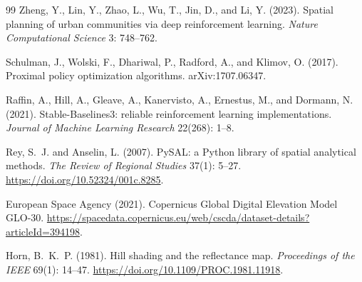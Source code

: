 \documentclass[]{interact}
\theoremstyle{plain}
\begin{document}
\begin{thebibliography}{99}
Zheng, Y., Lin, Y., Zhao, L., Wu, T., Jin, D., and Li, Y. (2023).
Spatial planning of urban communities via deep reinforcement learning.
\textit{Nature Computational Science} 3: 748--762.

Schulman, J., Wolski, F., Dhariwal, P., Radford, A., and Klimov, O. (2017).
Proximal policy optimization algorithms.
arXiv:1707.06347.

Raffin, A., Hill, A., Gleave, A., Kanervisto, A., Ernestus, M., and Dormann, N. (2021).
Stable-Baselines3: reliable reinforcement learning implementations.
\textit{Journal of Machine Learning Research} 22(268): 1--8.

Rey, S.~J. and Anselin, L. (2007).
PySAL: a Python library of spatial analytical methods.
\textit{The Review of Regional Studies} 37(1): 5--27.
\url{https://doi.org/10.52324/001c.8285}.

European Space Agency (2021).
Copernicus Global Digital Elevation Model GLO-30.
\url{https://spacedata.copernicus.eu/web/cscda/dataset-details?articleId=394198}.

Horn, B.~K.~P. (1981).
Hill shading and the reflectance map.
\textit{Proceedings of the IEEE} 69(1): 14--47.
\url{https://doi.org/10.1109/PROC.1981.11918}.

\end{thebibliography}
\end{document}
